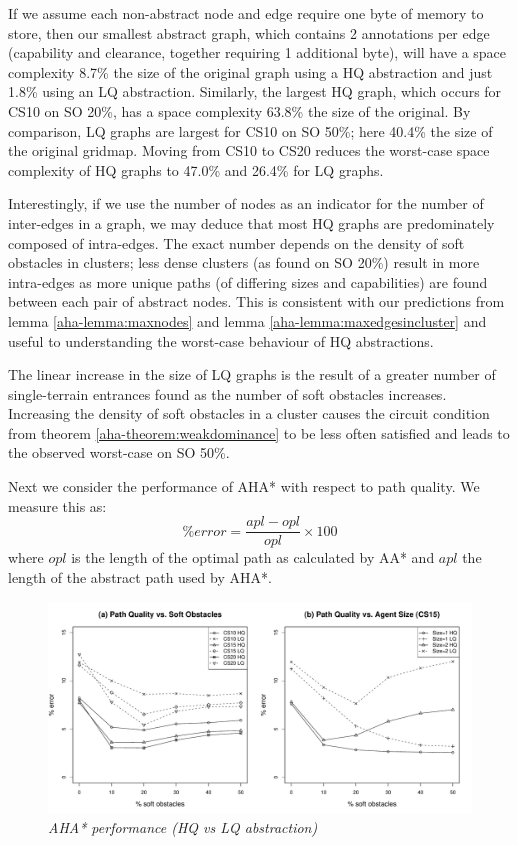 If we assume each non-abstract node and edge require one byte of memory to store, then our smallest abstract graph, which contains 2 annotations per edge (capability and clearance, together requiring 1 additional byte), will have a space complexity 8.7\% the size of the original graph using a HQ abstraction and just 1.8\% using an LQ abstraction.
Similarly, the largest HQ graph, which occurs for CS10 on SO 20\%, has a space complexity 63.8\% the size of the original.
By comparison, LQ graphs are largest for CS10 on SO 50\%; here 40.4\% the size of the original gridmap.
Moving from CS10 to CS20 reduces the worst-case space complexity of HQ graphs to 47.0\% and 26.4\% for LQ graphs.
\par \indent
Interestingly, if we use the number of nodes as an indicator for the number of inter-edges in a graph, we may deduce that most HQ graphs are predominately composed of intra-edges. 
The exact number depends on the density of soft obstacles in clusters; less dense clusters (as found on SO 20\%) result in more intra-edges as more unique paths (of differing sizes and capabilities) are found between each pair of abstract nodes. 
This is consistent with our predictions from lemma \ref{aha-lemma:maxnodes} and lemma \ref{aha-lemma:maxedgesincluster} and useful to understanding the worst-case behaviour of HQ abstractions.
\par \indent
The linear increase in the size of LQ graphs is the result of a greater number of single-terrain entrances found as the number of soft obstacles increases.
Increasing the density of soft obstacles in a cluster causes the circuit condition from theorem \ref{aha-theorem:weakdominance} to be less often satisfied and leads to the observed worst-case on SO 50\%.
\par \indent
Next we consider the performance of AHA* with respect to path quality. We measure this as:
$$ \%error = \frac{apl - opl}{opl} \times 100 $$ where $opl$ is the length of the optimal path as calculated by AA* and $apl$ the length of the abstract path used by AHA*.
\begin{figure}[htbp]
	\vspace{-12pt}
	\caption{\small{\emph{AHA* performance (HQ vs LQ abstraction)}}}
	\begin{center}
		       \includegraphics[scale=0.25, trim = 20mm 17mm 20mm 5mm]{diagrams/pathquality.pdf}
	\end{center}
	\label{aha-fig:pathquality}
	\vspace{-5pt}
\end{figure}
